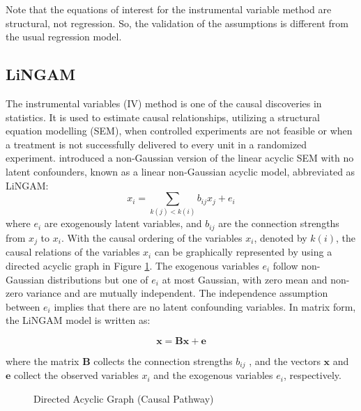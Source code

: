 \documentclass{article}\usepackage[]{graphicx}\usepackage[]{xcolor}
\begin{document}
Note that the equations of interest for the instrumental variable method are structural, not regression.
So, the validation of the assumptions is different from the usual regression model.

\newpage
\subsection*{LiNGAM}
The instrumental variables (IV) method is one of the causal discoveries in statistics.
It is used to estimate causal relationships, utilizing a structural equation modelling (SEM), 
when controlled experiments are not feasible or when a treatment is not successfully delivered to every unit in a randomized experiment.
\cite{shimizu2006linear} introduced a non-Gaussian version of the linear acyclic SEM 
with no latent confounders, known as a linear non-Gaussian acyclic model, abbreviated as LiNGAM:
$$x_i=\sum_{k(j)<k(i)}b_{ij}x_j+e_i$$
where $e_i$ are exogenously latent variables, and $b_{ij}$ are the connection strengths from $x_j$ to $x_i$. 
With the causal ordering of the variables $x_i$, denoted by $k(i)$, 
the causal relations of the variables $x_i$ can be graphically represented by using a directed acyclic graph in Figure \ref{fig:l}. 
The exogenous variables $e_i$ follow non-Gaussian distributions but one of $e_i$ at most Gaussian, 
with zero mean and non-zero variance and are mutually independent. 
The independence assumption between $e_i$ implies that there are no latent confounding variables. 
In matrix form, the LiNGAM model is written as:

$$\mathbf{x} = \mathbf{B}\mathbf{x}+\mathbf{e}$$

where the matrix $\mathbf{B}$ collects the connection strengths $b_{ij}$ , 
and the vectors $\mathbf{x}$ and $\mathbf{e}$ collect the observed variables $x_i$ and the exogenous variables $e_i$, respectively.

\begin{figure}[htp]
\centering
{}
\caption{Directed Acyclic Graph (Causal Pathway)}
\label{fig:l}
\end{figure}
\end{document}
